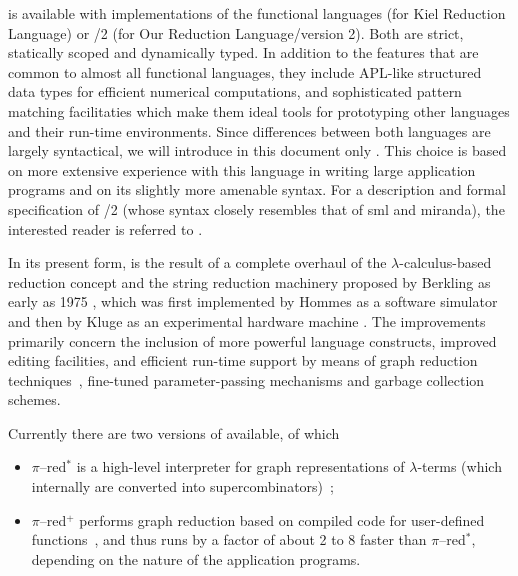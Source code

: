 \pired is available with implementations of the functional languages \kir (for {\mys Kiel Reduction Language})
or \orel/2 (for {\mys Our Reduction Language}/version 2). Both are
strict, statically scoped and dynamically typed. In addition to
the features that are
common to almost all functional languages, they include APL-like
structured data types \cite{iv62,abr70,schm86,schm91} for efficient numerical computations, and
sophisticated
{\mys pattern matching} facilitaties which make them ideal tools for prototyping
other languages and their run-time environments. 
Since differences between both languages are
largely syntactical, we will introduce in this document only \kir.
This choice is based on more extensive experience with this language in
writing large application programs and on its slightly more amenable syntax.
For a description and formal specification of \orel/2 (whose syntax 
closely  resembles that of {\sc sml} and {\sc miranda}), the interested reader
is referred to \cite{ples90}.  
   
In its present form, \pired is the result of a complete overhaul of the
$\lambda$-calculus-based reduction concept and the string reduction machinery proposed by
Berkling as early as 1975 \cite{berk75,berk78}, which was first
 implemented by Hommes as a software
simulator \cite{homm77b,homm80} and then by Kluge as an experimental
 hardware machine \cite{klug79,klug80}. The
improvements primarily concern the inclusion of more powerful language
constructs, improved editing facilities, and  efficient run-time support by means of graph
reduction techniques~\cite{schm91,zim91}, 
fine-tuned parameter-passing mechanisms and garbage collection schemes.

Currently there are two versions of \pired available, of which
\begin{itemize}
\item $\pi$--{\sc red}$^*$ is a {\mys high-level interpreter} for graph representations
of $\lambda$-terms (which internally are converted into supercombinators)~\cite{schm91};
\item $\pi$--{\sc red}$^+$ performs {\mys graph reduction} based on compiled code for
user-defined functions~\cite{gaer91}, and thus runs by a factor of about 2 to 8
faster than $\pi$--{\sc red}$^*$, depending on the nature of the 
application programs.
\end{itemize}

